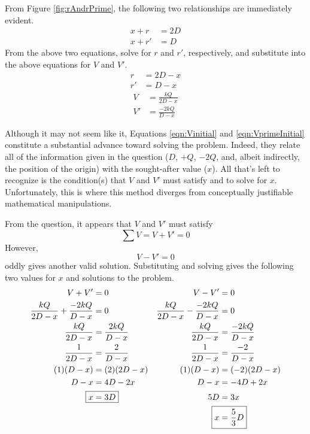 \documentclass[titlepage]{article}
\begin{document}
From Figure \ref{fig:rAndrPrime}, the following two relationships are immediately evident.
\begin{align*}
    x+r &= 2D\\
    x+r' &= D
\end{align*}
From the above two equations, solve for $r$ and $r'$, respectively, and substitute into the above equations for $V$ and $V'$.
\begin{align*}
    r &= 2D-x\\
    r' &= D-x
\end{align*}
\begin{align}
    V &= \frac{kQ}{2D-x}\label{eqn:Vinitial}\\
    V' &= \frac{-2kQ}{D-x}\label{eqn:VprimeInitial}
\end{align}

Although it may not seem like it, Equations \ref{eqn:Vinitial} and \ref{eqn:VprimeInitial} constitute a substantial advance toward solving the problem. Indeed, they relate all of the information given in the question ($D$, $+Q$, $-2Q$, and, albeit indirectly, the position of the origin) with the sought-after value ($x$). All that's left to recognize is the condition(s) that $V$ and $V'$ must satisfy and to solve for $x$. Unfortunately, this is where this method diverges from conceptually justifiable mathematical manipulations.\par
From the question, it appears that $V$ and $V'$ must satisfy $$\sum V=V+V'=0$$ However, $$V-V'=0$$ oddly gives another valid solution. Substituting and solving gives the following two values for $x$ and solutions to the problem.
\begin{align*}
    V+V' &= 0&
        V-V' &= 0\\
    \frac{kQ}{2D-x}+\frac{-2kQ}{D-x} &= 0&
        \frac{kQ}{2D-x}-\frac{-2kQ}{D-x} &= 0\\
    \frac{kQ}{2D-x} &= \frac{2kQ}{D-x}&
        \frac{kQ}{2D-x} &= \frac{-2kQ}{D-x}\\
    \frac{1}{2D-x} &= \frac{2}{D-x}&
        \frac{1}{2D-x} &= \frac{-2}{D-x}\\
    (1)(D-x) &= (2)(2D-x)&
        (1)(D-x) &= (-2)(2D-x)\\
    D-x &= 4D-2x&
        D-x &= -4D+2x\\
    \Aboxed{x &= 3D}&
        5D &= 3x\\
    &&
        \Aboxed{x &= \frac{5}{3}D}
\end{align*}
\end{document}

